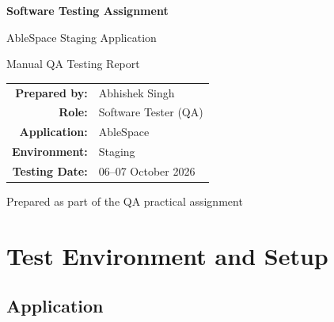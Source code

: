 \documentclass[11pt,a4paper]{article}
\begin{document}
\begin{titlepage}
    \centering

    \vspace*{2cm}

    {\Huge\bfseries Software Testing Assignment\par}

    \vspace{0.7cm}

    {\LARGE AbleSpace Staging Application\par}

    \vspace{1.5cm}

    {\Large Manual QA Testing Report\par}

    \vspace{2cm}

    \begin{tabular}{rl}
        \textbf{Prepared by:} & Abhishek Singh \\
        \textbf{Role:} & Software Tester (QA) \\
        \textbf{Application:} & AbleSpace \\
        \textbf{Environment:} & Staging \\
        \textbf{Testing Date:} & 06--07 October 2026 \\
    \end{tabular}

    \vfill

    {\large Prepared as part of the QA practical assignment\par}

\end{titlepage}

\tableofcontents
\newpage


\section{Test Environment and Setup}

\subsection{Application}
\end{document}
